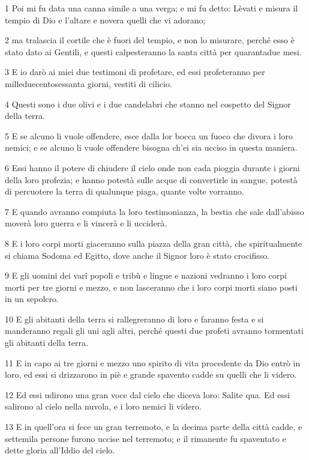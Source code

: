 \par 1 Poi mi fu data una canna simile a una verga; e mi fu detto: Lèvati e misura il tempio di Dio e l'altare e novera quelli che vi adorano;
\par 2 ma tralascia il cortile che è fuori del tempio, e non lo misurare, perché esso è stato dato ai Gentili, e questi calpesteranno la santa città per quarantadue mesi.
\par 3 E io darò ai miei due testimoni di profetare, ed essi profeteranno per milleduecentosessanta giorni, vestiti di cilicio.
\par 4 Questi sono i due olivi e i due candelabri che stanno nel cospetto del Signor della terra.
\par 5 E se alcuno li vuole offendere, esce dalla lor bocca un fuoco che divora i loro nemici; e se alcuno li vuole offendere bisogna ch'ei sia ucciso in questa maniera.
\par 6 Essi hanno il potere di chiudere il cielo onde non cada pioggia durante i giorni della loro profezia; e hanno potestà sulle acque di convertirle in sangue, potestà di percuotere la terra di qualunque piaga, quante volte vorranno.
\par 7 E quando avranno compiuta la loro testimonianza, la bestia che sale dall'abisso moverà loro guerra e li vincerà e li ucciderà.
\par 8 E i loro corpi morti giaceranno sulla piazza della gran città, che spiritualmente si chiama Sodoma ed Egitto, dove anche il Signor loro è stato crocifisso.
\par 9 E gli uomini dei varî popoli e tribù e lingue e nazioni vedranno i loro corpi morti per tre giorni e mezzo, e non lasceranno che i loro corpi morti siano posti in un sepolcro.
\par 10 E gli abitanti della terra si rallegreranno di loro e faranno festa e si manderanno regali gli uni agli altri, perché questi due profeti avranno tormentati gli abitanti della terra.
\par 11 E in capo ai tre giorni e mezzo uno spirito di vita procedente da Dio entrò in loro, ed essi si drizzarono in piè e grande spavento cadde su quelli che li videro.
\par 12 Ed essi udirono una gran voce dal cielo che diceva loro: Salite qua. Ed essi salirono al cielo nella nuvola, e i loro nemici li videro.
\par 13 E in quell'ora si fece un gran terremoto, e la decima parte della città cadde, e settemila persone furono uccise nel terremoto; e il rimanente fu spaventato e dette gloria all'Iddio del cielo.
